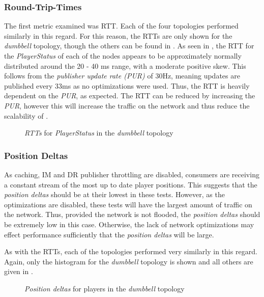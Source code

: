 \subsubsection*{Round-Trip-Times}
The first metric examined was RTT. Each of the four topologies performed similarly in this regard. For this reason, the RTTs are only shown for the \textit{dumbbell} topology, though the others can be found in . As seen in , the RTT for the \textit{PlayerStatus} of each of the nodes appears to be approximately normally distributed around the 20 - 40 ms range, with a moderate positive skew. This follows from the \textit{publisher update rate (PUR)} of 30Hz, meaning updates are published every 33ms as no optimizations were used. Thus, the RTT is heavily dependent on the \textit{PUR}, as expected. The RTT can be reduced by increasing the \textit{PUR}, however this will increase the traffic on the network and thus reduce the scalability of \game{}.  

\begin{figure}[H]
    \centering
    \caption{\textit{RTTs} for \textit{PlayerStatus} in the \textit{dumbbell} topology}
    \label{fig:eval:basic:rtt}
\end{figure}


\subsubsection*{Position Deltas}
As caching, IM and DR publisher throttling are disabled, consumers are receiving a constant stream of the most up to date player positions. This suggests that the \textit{position deltas} should be at their lowest in these tests. However, as the optimizations are disabled, these tests will have the largest amount of traffic on the network. Thus, provided the network is not flooded, the \textit{position deltas} should be extremely low in this case. Otherwise, the lack of network optimizations may effect performance sufficiently that the \textit{position deltas} will be large. 

As with the RTTs, each of the topologies performed very similarly in this regard. Again, only the histogram for the \textit{dumbbell} topology is shown and all others are given in .

\begin{figure}[H]
    \centering
    \caption{\textit{Position deltas} for players in the \textit{dumbbell} topology}
    \label{fig:eval:basic:pos-deltas}
\end{figure}

